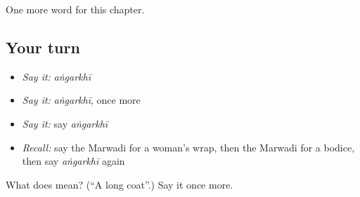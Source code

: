 \begin{grammarlens}[title={What you've built}]
One more word for this chapter.
\end{grammarlens}

\subsection*{Your turn}
\begin{itemize}
\raggedright
  \item \emph{Say it:} \emph{aṅgarkhī}
  \item \emph{Say it:} \emph{aṅgarkhī}, once more
  \item \emph{Say it:} say \emph{aṅgarkhī}
  \item \emph{Recall:} say the Marwadi for a woman's wrap, then the Marwadi for a bodice, then say \emph{aṅgarkhī} again
\end{itemize}

\begin{tcolorbox}[breakable,colback=teal!4,colframe=teal!35!black,title={Before you move on}]
What does  mean? (\textquotedblleft{}A long coat\textquotedblright{}.) Say it once more.
\end{tcolorbox}
